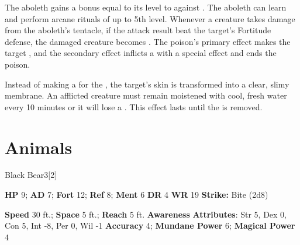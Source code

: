        The aboleth gains a bonus equal to its level to  against .
     The aboleth can learn and perform arcane rituals of up to 5th level.
        Whenever a creature takes damage from the aboleth's tentacle,
          if the attack result beat the target's Fortitude defense,
          the damaged creature becomes .
        The poison's primary effect makes the target ,
          and the secondary effect inflicts a  with a special effect and ends the poison.

        Instead of making a  for the ,
          the target's skin is transformed into a clear, slimy membrane.
        An afflicted creature must remain moistened with cool, fresh water every 10 minutes
          or it will lose a .
        This effect lasts until the  is removed.
  
        \section{Animals}
      
  \begin{monsection}{Black Bear}{3}[2]
    \vspace{-1em}\vspace{-1em}
    \begin{spellcontent}
      \begin{spelltargetinginfo}
        \pari \textbf{HP} 9;
          \textbf{AD} 7;
          \textbf{Fort} 12;
          \textbf{Ref} 8;
          \textbf{Ment} 6
        \pari \textbf{DR} 4
        \pari \textbf{WR} 19
        \pari \textbf{Strike:}
            Bite  (2d8)
      \end{spelltargetinginfo}
    \end{spellcontent}
    \begin{monsterfooter}
      \pari \textbf{Speed} 30 ft.;
        \textbf{Space} 5 ft.;
        \textbf{Reach} 5 ft.
      \pari \textbf{Awareness} 
      \pari \textbf{Attributes}:
        Str 5, Dex 0, Con 5,
        Int -8, Per 0, Wil -1
      \pari \textbf{Accuracy} 4;
        \textbf{Mundane Power} 6;
      \textbf{Magical Power} 4
    \end{monsterfooter}
  \end{monsection}
  
